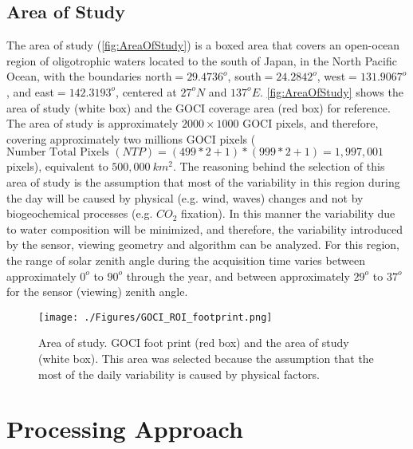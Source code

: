 \documentclass[onecolumn,3p,letterpaper,11pt]{elsarticle}
\begin{document}
\subsection{Area of Study}

The area of study (\autoref{fig:AreaOfStudy}) is a boxed area that covers an open-ocean region of oligotrophic waters located to the south of Japan, in the North Pacific Ocean, with the boundaries north$=29.4736^o$, south$=24.2842^o$, west$=131.9067^o$, and east$=142.3193^o$, centered at $27^oN$ and $137^oE$. \autoref{fig:AreaOfStudy} shows the area of study (white box) and the GOCI coverage area (red box) for reference. The area of study is approximately $2000\times 1000$ GOCI pixels, and therefore, covering approximately two millions GOCI pixels ($\text{Number Total Pixels } (NTP) = (499*2+1)*(999*2+1) =  1,997,001$ pixels), equivalent to $500,000\ km^2$. The reasoning behind the selection of this area of study is the assumption that most of the variability in this region during the day will be caused by physical (e.g. wind, waves) changes and not by biogeochemical processes (e.g. $CO_2$ fixation). In this manner the variability due to water composition will be minimized, and therefore, the variability introduced by the sensor, viewing geometry and algorithm can be analyzed. For this region, the range of solar zenith angle during the acquisition time  varies between approximately $0^o$ to $90^o$ through the year, and between approximately $29^o$ to $37^o$ for the sensor (viewing) zenith angle.

\begin{figure}[ht]
	\centering
    \texttt{[image: ./Figures/GOCI\_ROI\_footprint.png]}
	\caption{Area of study. GOCI foot print (red box) and the area of study (white box). This area was selected because the assumption that the most of the daily variability is caused by physical factors.}
	\label{fig:AreaOfStudy}
\end{figure}
\section{Processing Approach}
\end{document}
